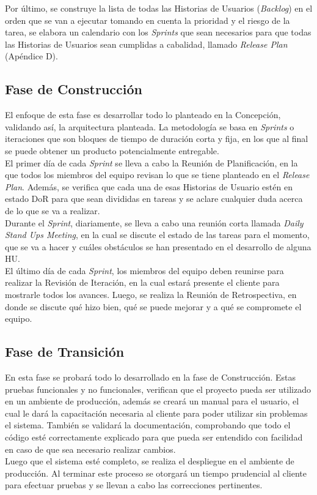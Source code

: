Por último, se construye la lista de todas las Historias de Usuarios (\textit{Backlog}) en el orden que se van a ejecutar tomando en cuenta la prioridad y el riesgo de la tarea, se elabora un calendario con los \textit{Sprints} que sean necesarios para que todas las Historias de Usuarios sean cumplidas a cabalidad, llamado \textit{Release Plan} (Apéndice D).

\subsection{Fase de Construcción}

El enfoque de esta fase es desarrollar todo lo planteado en la Concepción, validando así, la arquitectura planteada. La metodología se basa en \textit{Sprints} o iteraciones que son bloques de tiempo de duración corta y fija, en los que al final se puede obtener un producto potencialmente entregable. \\

El primer día de cada \textit{Sprint} se lleva a cabo la Reunión de Planificación, en la que todos los miembros del equipo revisan lo que se tiene planteado en el \textit{Release Plan}. Además, se verifica que cada una de esas Historias de Usuario estén en estado DoR para que sean divididas en tareas y se aclare cualquier duda acerca de lo que se va a realizar. \\

Durante el \textit{Sprint}, diariamente, se lleva a cabo una reunión corta llamada \textit{Daily Stand Ups Meeting}, en la cual se discute el estado de las tareas para el momento, que se va a hacer y cuáles obstáculos se han presentado en el desarrollo de alguna HU.\\

El último día de cada \textit{Sprint}, los miembros del equipo deben reunirse para realizar la Revisión de Iteración, en la cual estará presente el cliente para mostrarle todos los avances. Luego, se realiza la Reunión de Retrospectiva, en donde se discute qué hizo bien, qué se puede mejorar y a qué se compromete el equipo.

\subsection{Fase de Transición}

En esta fase se probará todo lo desarrollado en la fase de Construcción. Estas pruebas funcionales y no funcionales, verifican que el proyecto pueda ser utilizado en un ambiente de producción, además se creará un manual para el usuario, el cual le dará la capacitación necesaria al cliente para poder utilizar sin problemas el sistema. También se validará la documentación, comprobando que todo el código esté correctamente explicado para que pueda ser entendido con facilidad en caso de que sea necesario realizar cambios.\\

Luego que el sistema esté completo, se realiza el despliegue en el ambiente de producción. Al terminar este proceso se otorgará un tiempo prudencial al cliente para efectuar pruebas y se llevan a cabo las correcciones pertinentes.
